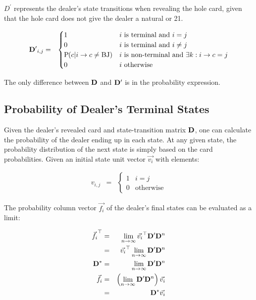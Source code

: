 $D^\prime$ represents the dealer's state transitions
when revealing the hole card,
given that the hole card does not give the dealer a natural or 21.

\begin{eqnarray}
\mathbf{D^\prime}_{i,j} &=&
\begin{cases}
1 & i~\text{is terminal and } i=j \\
0 & i~\text{is terminal and } i\neq{}j \\
\textrm{P}\hspace{-.5ex}\left(c|i\rightarrow{}c\neq{}\text{BJ}\right) &
  i~\text{is non-terminal and } \exists k : i\rightarrow{}c = j \\
0 & i~\text{otherwise}
\end{cases}
\end{eqnarray}

\noindent
The only difference between $\mathbf{D}$ and $\mathbf{D^\prime}$
is in the probability expression.  

\subsection{Probability of Dealer's Terminal States}
\label{sec:rules:dealer-play:final-pdf}

Given the dealer's revealed card and state-transition matrix $\mathbf{D}$, 
one can calculate the probability of the dealer ending up in each state.
At any given state, the probability distribution of the
next state is simply based on the card probabilities.  
Given an initial state unit vector $\Vec{v_i}$ with elements:

\begin{eqnarray}
v_{i,j} &=& 
\begin{cases}
1 & i=j \\
0 & \text{otherwise}
\end{cases}
\end{eqnarray}

\noindent
The probability column vector $\Vec{f_i}$ of the dealer's final states 
can be evaluated as a limit:

\begin{eqnarray}
\vec{f_i}^{\top} &=& \lim_{n\rightarrow\infty}{\vec{v_i}^{\top}\mathbf{D^\prime}\mathbf{D}^n} \nonumber \\
&=& \vec{v_i}^{\top} \lim_{n\rightarrow\infty}{\mathbf{D^\prime}\mathbf{D}^n} \\
\mathbf{D^*} &=& \lim_{n\rightarrow\infty}{\mathbf{D^\prime}\mathbf{D}^n} \\
\vec{f_i} &=& \left(\lim_{n\rightarrow\infty}{\mathbf{D^\prime}\mathbf{D}^n}\right) \vec{v_i} \nonumber \\
&=& \mathbf{D^*} \vec{v_i}
\end{eqnarray}

